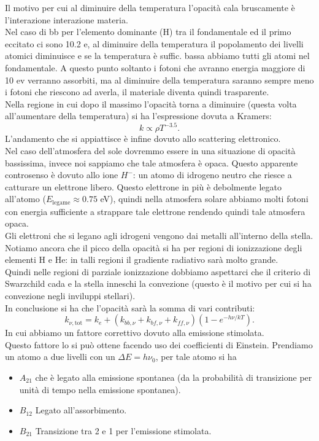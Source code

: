 Il motivo per cui al diminuire della temperatura l'opacità cala bruscamente è l'interazione interazione materia.\\
Nel caso di bb per l'elemento dominante (H) tra il fondamentale ed il primo eccitato ci sono 10.2 e, al diminuire della temperatura il popolamento dei livelli atomici diminuisce e se la temperatura è suffic. bassa abbiamo tutti gli atomi nel fondamentale. A questo punto soltanto i fotoni che avranno energia maggiore di 10 ev verranno assorbiti, ma al diminuire della temperatura saranno sempre meno i fotoni che riescono ad averla, il materiale diventa quindi trasparente.\\
Nella regione in cui dopo il massimo l'opacità torna a diminuire (questa volta all'aumentare della temperatura) si ha l'espressione dovuta a Kramers:
\[
k \propto \rho T^{-3.5}
.\] 
L'andamento che si appiattisce è infine dovuto allo scattering elettronico.\\
Nel caso dell'atmosfera del sole dovremmo essere in una situazione di opacità bassissima, invece noi sappiamo che tale atmosfera è opaca. Questo apparente controsenso è dovuto allo ione $H^{-}$: un atomo di idrogeno neutro che riesce a catturare un elettrone libero. Questo elettrone in più è debolmente legato all'atomo  ($E_\text{legame}\approx 0.75$ eV), quindi nella atmosfera solare abbiamo molti fotoni con energia sufficiente a strappare tale elettrone rendendo quindi tale atmosfera opaca.\\
Gli elettroni che si legano agli idrogeni vengono dai metalli all'interno della stella.\\
Notiamo ancora che il picco della opacità si ha per regioni di ionizzazione degli elementi H e He: in talli regioni il gradiente radiativo sarà molto grande.\\
Quindi nelle regioni di parziale ionizzazione dobbiamo aspettarci che il criterio di Swarzchild cada e la stella inneschi la convezione (questo è il motivo per cui si ha convezione negli inviluppi stellari).\\
In conclusione si ha che l'opacità sarà la somma di vari contributi:
\[
    k_{\nu, \text{tot}} = k_e + \left(k_{bb,\nu}+ k_{bf,\nu}+k_{ff,\nu}\right)
    \left(1-e^{-h\nu  /kT}\right)
.\] 
In cui abbiamo un fattore correttivo dovuto alla emissione stimolata.\\
Questo fattore lo si può ottene facendo uso dei coefficienti di Einstein. Prendiamo un atomo a due livelli con un $\Delta  E = h\nu_0$, per tale atomo si ha
\begin{itemize}
    \item $A_{21}$ che è legato alla emissione spontanea (da la probabilità di transizione per unità di tempo nella emissione spontanea). 
    \item $B_{12}$ Legato all'assorbimento.
    \item $B_{21}$ Transizione tra 2 e 1 per l'emissione stimolata.
\end{itemize}

